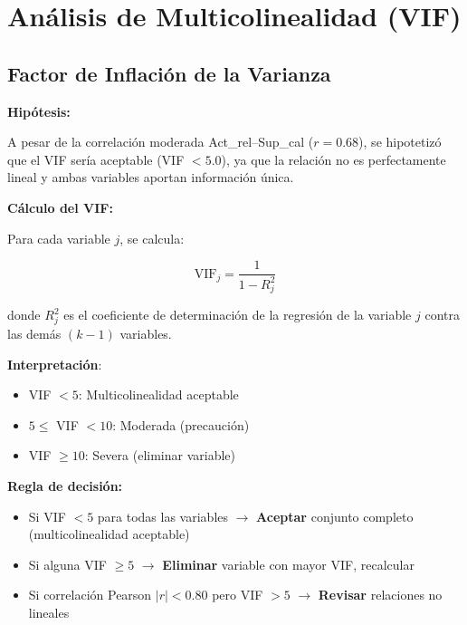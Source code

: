 \documentclass[12pt,letterpaper,twoside]{report}
\begin{document}
\section{Análisis de Multicolinealidad (VIF)}

\subsection{Factor de Inflación de la Varianza}

\begin{hipotesisbox}
\textbf{Hipótesis:}

A pesar de la correlación moderada Act\_rel--Sup\_cal ($r=0.68$), se hipotetizó que el VIF sería aceptable (VIF $< 5.0$), ya que la relación no es perfectamente lineal y ambas variables aportan información única.
\end{hipotesisbox}

\begin{estadisticobox}
\textbf{Cálculo del VIF:}

Para cada variable $j$, se calcula:

\begin{equation}
\text{VIF}_j = \frac{1}{1 - R^2_j}
\end{equation}

donde $R^2_j$ es el coeficiente de determinación de la regresión de la variable $j$ contra las demás $(k-1)$ variables.

\textbf{Interpretación}:
\begin{itemize}[noitemsep]
    \item VIF $< 5$: Multicolinealidad aceptable
    \item $5 \leq$ VIF $< 10$: Moderada (precaución)
    \item VIF $\geq 10$: Severa (eliminar variable)
\end{itemize}
\end{estadisticobox}

\begin{reglabox}
\textbf{Regla de decisión:}

\begin{itemize}[noitemsep]
    \item Si VIF $< 5$ para todas las variables $\to$ \textbf{Aceptar} conjunto completo (multicolinealidad aceptable)
    \item Si alguna VIF $\geq 5$ $\to$ \textbf{Eliminar} variable con mayor VIF, recalcular
    \item Si correlación Pearson $|r| < 0.80$ pero VIF $> 5$ $\to$ \textbf{Revisar} relaciones no lineales
\end{itemize}
\end{reglabox}
\end{document}
